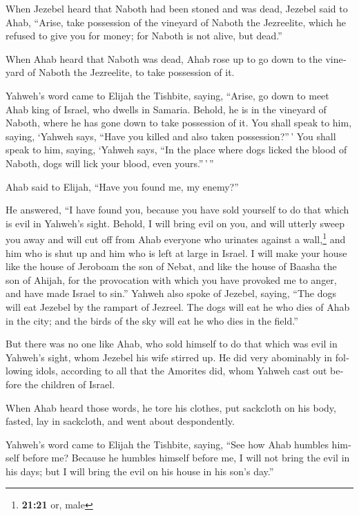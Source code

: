 \begin{paracol}{2}
\begin{otherlanguage}{english}
 When Jezebel heard that Naboth had been stoned and was
dead, Jezebel said to Ahab, ``Arise, take possession of the vineyard of
Naboth the Jezreelite, which he refused to give you for money; for
Naboth is not alive, but dead.''

 When Ahab heard that Naboth was dead, Ahab rose up to go
down to the vineyard of Naboth the Jezreelite, to take possession of it.

 Yahweh's word came to Elijah the Tishbite, saying,
 ``Arise, go down to meet Ahab king of Israel, who dwells
in Samaria. Behold, he is in the vineyard of Naboth, where he has gone
down to take possession of it.  You shall speak to him,
saying, `Yahweh says, ``Have you killed and also taken possession?''\,'
You shall speak to him, saying, `Yahweh says, ``In the place where dogs
licked the blood of Naboth, dogs will lick your blood, even
yours.''\,'\,''

 Ahab said to Elijah, ``Have you found me, my enemy?''

He answered, ``I have found you, because you have sold yourself to do
that which is evil in Yahweh's sight.  Behold, I will
bring evil on you, and will utterly sweep you away and will cut off from
Ahab everyone who urinates against a wall,\footnote{\textbf{21:21} or,
  male} and him who is shut up and him who is left at large in Israel.
 I will make your house like the house of Jeroboam the
son of Nebat, and like the house of Baasha the son of Ahijah, for the
provocation with which you have provoked me to anger, and have made
Israel to sin.''  Yahweh also spoke of Jezebel, saying,
``The dogs will eat Jezebel by the rampart of Jezreel. 
The dogs will eat he who dies of Ahab in the city; and the birds of the
sky will eat he who dies in the field.''

 But there was no one like Ahab, who sold himself to do
that which was evil in Yahweh's sight, whom Jezebel his wife stirred up.
 He did very abominably in following idols, according to
all that the Amorites did, whom Yahweh cast out before the children of
Israel.

 When Ahab heard those words, he tore his clothes, put
sackcloth on his body, fasted, lay in sackcloth, and went about
despondently.

 Yahweh's word came to Elijah the Tishbite, saying,
 ``See how Ahab humbles himself before me? Because he
humbles himself before me, I will not bring the evil in his days; but I
will bring the evil on his house in his son's day.''


\end{otherlanguage}
\end{paracol}
